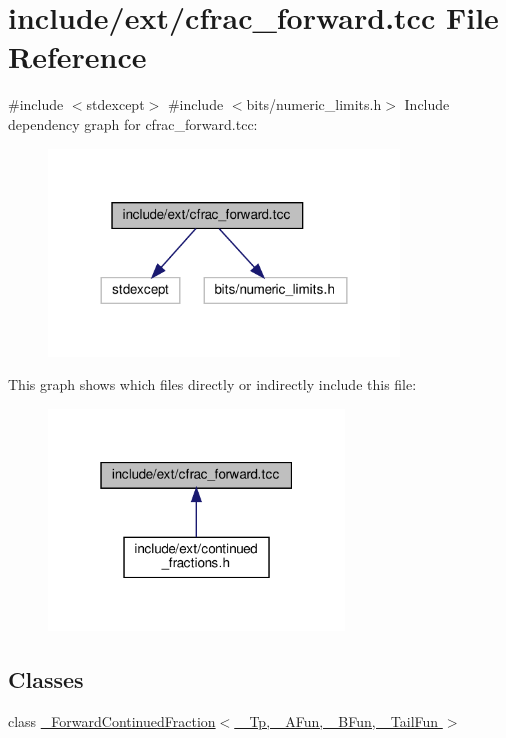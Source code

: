 \hypertarget{cfrac__forward_8tcc}{}\section{include/ext/cfrac\+\_\+forward.tcc File Reference}
\label{cfrac__forward_8tcc}
{\ttfamily \#include $<$stdexcept$>$}\newline
{\ttfamily \#include $<$bits/numeric\+\_\+limits.\+h$>$}\newline
Include dependency graph for cfrac\+\_\+forward.\+tcc\+:
\nopagebreak
\begin{figure}[H]
\begin{center}
\leavevmode
\includegraphics[width=264pt]{cfrac__forward_8tcc__incl}
\end{center}
\end{figure}
This graph shows which files directly or indirectly include this file\+:
\nopagebreak
\begin{figure}[H]
\begin{center}
\leavevmode
\includegraphics[width=223pt]{cfrac__forward_8tcc__dep__incl}
\end{center}
\end{figure}
\subsection*{Classes}
\begin{DoxyCompactItemize}
\item 
class \hyperlink{class__ForwardContinuedFraction}{\+\_\+\+Forward\+Continued\+Fraction$<$ \+\_\+\+Tp, \+\_\+\+A\+Fun, \+\_\+\+B\+Fun, \+\_\+\+Tail\+Fun $>$}
\end{DoxyCompactItemize}
